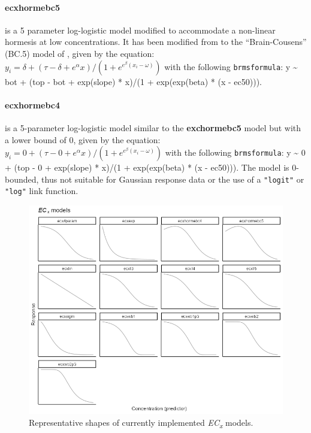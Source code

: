 \documentclass[
  shortnames]{jss}
\begin{document}
\hypertarget{ecxhormebc5}{%
\paragraph{ecxhormebc5}\label{ecxhormebc5}}

is a 5 parameter log-logistic model modified to accommodate a non-linear hormesis at low concentrations. It has been modified from to the ``Brain-Cousens'' (BC.5) model of \citet{Ritz2016}, given by the equation:
\(y_i = \delta + (\tau - \delta + e^{\alpha} x)/ (1 + e^{e^{\beta} (x_i - \omega)})\)
with the following \texttt{brmsformula}: y \textasciitilde{} bot + (top - bot + exp(slope) * x)/(1 + exp(exp(beta) * (x - ec50))).

\hypertarget{ecxhormebc4}{%
\paragraph{ecxhormebc4}\label{ecxhormebc4}}

is a 5-parameter log-logistic model similar to the \textbf{exchormebc5} model but with a lower bound of 0, given by the equation:
\(y_i = 0 + (\tau - 0 + e^{\alpha} x)/ (1 + e^{e^{\beta} (x_i - \omega)})\)
with the following \texttt{brmsformula}: y \textasciitilde{} 0 + (top - 0 + exp(slope) * x)/(1 + exp(exp(beta) * (x - ec50))). The model is 0-bounded, thus not suitable for Gaussian response data or the use of a \texttt{"logit"} or \texttt{"log"} link function.

\begin{figure}[ht]
  \centering
  \includegraphics[width=1\textwidth]{../vignettes/vignette-fig-exmp2b-theoretical_ecx_curves.png}
  \caption{Representative shapes of currently implemented  \textit{EC\textsubscript{x}} models.}
  \label{fig1}
\end{figure}
\end{document}
